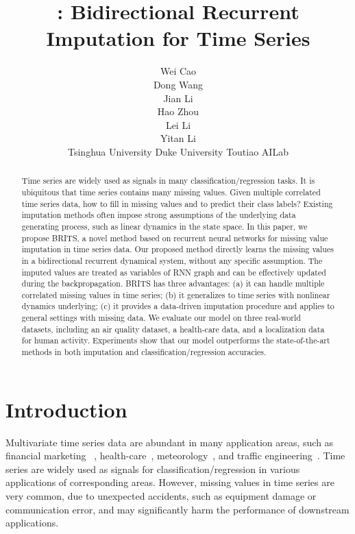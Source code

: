 \documentclass{article}
\title{\methodname: Bidirectional Recurrent Imputation for Time Series}
\author{
Wei Cao \\
\And
Dong Wang \\
\And
Jian Li\\
\And
Hao Zhou\\
\And
Lei Li\\
\And
Yitan Li\\
\AND
Tsinghua University \quad Duke University \quad  Toutiao AILab
}
\newcommand{\methodname}{\xspace{BRITS}}
\begin{document}
\maketitle

\begin{abstract}

Time series are widely used as signals in many classification/regression tasks. It is ubiquitous that time series contains many missing values. Given multiple correlated time series data, how to fill in missing values and to predict their class labels? 
Existing imputation methods often impose strong assumptions of the underlying data generating process, such as linear dynamics in the state space. 
In this paper, we propose \methodname, a novel method based on recurrent neural networks for missing value imputation in time series data. 
Our proposed method directly learns the missing values in a bidirectional recurrent dynamical system, without any specific assumption. The imputed values are treated as variables of RNN graph and can be effectively updated during the backpropagation.
BRITS has three advantages: (a) it can handle multiple correlated missing values in time series; (b) it generalizes to time series with nonlinear dynamics underlying; (c) it provides a data-driven imputation procedure and applies to general settings with missing data.
We evaluate our model on three real-world datasets, including an air quality dataset, a health-care data, and a localization data for human activity.
Experiments show that our model outperforms the state-of-the-art methods in both imputation and classification/regression accuracies. 

\end{abstract} \section{Introduction}
\label{sec:introduction}

Multivariate time series data are abundant in many application areas, such as financial marketing ~\cite{bauer2016arrow,batres2015deep}, health-care~\cite{che2018recurrent,liu2016learning}, meteorology~\cite{xingjian2015convolutional,rani2012recent},
and traffic engineering~\cite{wang2017deepsd,zhang2017deep}.
Time series are widely used as signals for classification/regression in  various applications of corresponding areas.
However, missing values in time series are very common, due to unexpected accidents, such as equipment damage or communication error, and may significantly harm the performance of downstream applications.
\end{document}
